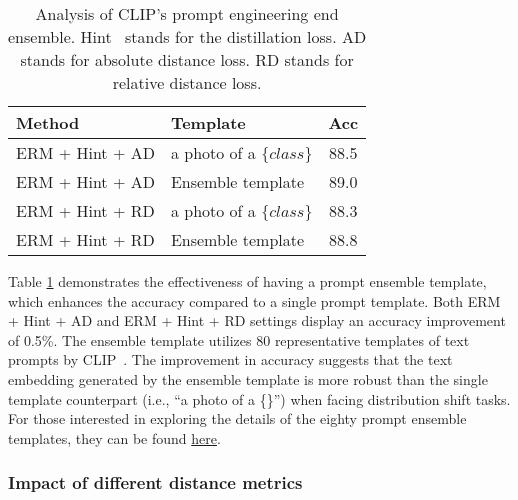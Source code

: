 \documentclass[10pt,twocolumn,letterpaper]{article}
\begin{document}
\begin{table}[htbp]
\begin{center}
\footnotesize
\begin{tabular}{l |l |c }
\hline
Method & Template  & Acc \\
\hline \hline
ERM + Hint + AD & a photo of a $\{class\}$ & 88.5 \\
\rowcolor{lightgray!30}ERM + Hint + AD & Ensemble template & 89.0 \\
\hline
ERM + Hint + RD & a photo of a $\{class\}$ & 88.3 \\
\rowcolor{lightgray!30}ERM + Hint + RD & Ensemble template &  88.8\\
\hline
\end{tabular}
\vspace{5pt}
\caption{Analysis of CLIP's prompt engineering end ensemble. Hint~\cite{hinton2015distilling} stands for the distillation loss. AD stands for absolute distance loss. RD stands for relative distance loss.}
\label{table:prompt}
\end{center}
\end{table}
Table \ref{table:prompt} demonstrates the effectiveness of having a prompt ensemble template, which enhances the accuracy compared to a single prompt template. Both ERM + Hint + AD and ERM + Hint + RD settings display an accuracy improvement of 0.5\%. The ensemble template utilizes 80 representative templates of text prompts by CLIP~\cite{radford2021learning}. The improvement in accuracy suggests that the text embedding generated by the ensemble template is more robust than the single template counterpart (i.e., ``a photo of a \{\}'') when facing distribution shift tasks. 
For those interested in exploring the details of the eighty prompt ensemble templates, they can be found \href{https://github.com/openai/CLIP/blob/main/notebooks/Prompt_Engineering_for_ImageNet.ipynb}{here}.


 

\subsubsection{Impact of different distance metrics}
\end{document}
